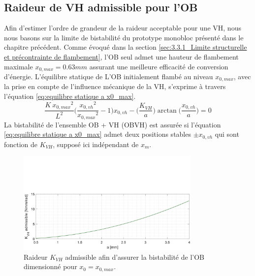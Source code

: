 	\subsection{Raideur de VH admissible pour l'OB}
	\label{subsec:4.2.1_Raideur de VH admissible pour l'OB}
Afin d'estimer l'ordre de grandeur de la raideur acceptable pour une VH, nous nous basons sur la limite de bistabilité du prototype monobloc présenté dans le chapitre précédent. Comme évoqué dans la section \ref{sec:3.3.1_Limite structurelle et précontrainte de flambement}, l'OB seul admet une hauteur de flambement maximale $x_{0,max} = 0.63mm$ assurant une meilleure efficacité de conversion d'énergie. L'équilibre statique de L'OB initialement flambé au niveau $x_{0,max}$, avec la prise en compte de l'influence mécanique de la VH, s'exprime à travers l'équation \ref{eq:equilibre statique a x0_max}.
\begin{equation}
 \frac{K\ {x_{0,max}}^2}{L^2}\biggl(\frac{{x_{0,vh}}^2}{{x_{0,max}}^2} -1\biggr)x_{0,vh} - \biggl( \frac{K_{VH}}{a} \biggr) \arctan \biggl(\frac{x_{0,vh}}{a} \biggr) = 0
	\label{eq:equilibre statique a x0_max}
\end{equation}
La bistabilité de l'ensemble OB + VH (OBVH) est assurée si l'équation \ref{eq:equilibre statique a x0_max} admet deux positions stables $\pm x_{0,vh}$ qui sont fonction de $K_{VH}$, supposé ici indépendant de $x_m$.
\begin{figure}[!htb]
	\begin{center}
		\captionsetup{justification=centering}
		\includegraphics[trim={0cm 0cm 0cm 7cm},clip,width=0.8\textwidth]{../Chap4/Figure/(K_VH)_max(a)_bistabilite.pdf}
		\caption{Raideur $K_{VH}$ admissible afin d'assurer la bistabilité de l'OB dimensionné pour $x_0=x_{0,max}$.}
		\label{fig:(K_VH)_max(a)_et_Deltatheta_pour_bistabilite}
	\end{center}
\end{figure}    

